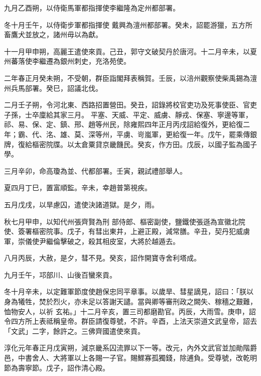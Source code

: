 \begin{pinyinscope}
 九月乙酉朔，以侍衛馬軍都指揮使李繼隆為定州都部署。



 冬十月壬午，以侍衛步軍都指揮使
 戴興為澶州都部署。癸未，詔罷游獵，五方所畜鷹犬並放之，諸州毋以為獻。



 十一月甲申朔，高麗王遣使來貢。己丑，郭守文破契丹於唐河。十二月辛未，以夏州蕃落使李繼遷為銀州刺史，充洛苑使。



 二年春正月癸未朔，不受朝，群臣詣閣拜表稱賀。壬辰，以涪州觀察使柴禹錫為澶州兵馬部署。癸巳，詔議北伐。



 二月壬子朔，令河北東、西路招置營田。癸丑，詔錄將校官吏功及死事使臣、官吏子孫，士卒廩給其家三月。
 平塞、天威、平定、威虜、靜戎、保塞、寧邊等軍，祁、易、保、定、鎮、邢、趙等州民，除雍熙四年正月丙戌詔給復外，更給復二年；霸、代、洺、雄、莫、深等州，平虜、岢嵐軍，更給復一年。戊午，罷乘傳銀牌，復給樞密院牒。以太倉粟貸京畿饑民。癸亥，作方田。戊辰，以國子監為國子學。



 三月辛卯，命高瓊為並、代都部署。壬寅，親試禮部舉人。



 夏四月丁巳，置富順監。辛未，幸趙普第視疾。



 五月戊戌，以旱慮囚，遣使決諸道獄。是夕，雨。



 秋七月甲申，以知代州張齊賢為刑
 部侍郎、樞密副使，鹽鐵使張遜為宣徽北院使、簽署樞密院事。戊子，有彗出東井，上避正殿，減常膳。辛丑，契丹犯威虜軍，崇儀使尹繼倫擊破之，殺其相皮室，大將於越遁去。



 八月丙辰，大赦，是夕，彗不見。癸亥，詔作開寶寺舍利塔成。



 九月壬午，邛部川、山後百蠻來貢。



 冬十月辛未，以定難軍節度使趙保忠同平章事。以歲旱、彗星謫見，詔曰：「朕以身為犧牲，焚於烈火，亦未足以答謝天譴。當與卿等審刑政之闕失、稼穡之艱難，恤物安人，以祈
 玄祐。」十二月辛亥，置三司都磨勘官。丙辰，大雨雪。庚申，詔令四方所上表祗稱皇帝。群臣請復尊號，不許。辛酉，上法天崇道文武皇帝，詔去「文武」二字，餘許之。三佛齊國遣使來貢。



 淳化元年春正月戊寅朔，減京畿系囚流罪以下一等。改元，內外文武官並加勛階爵邑，中書舍人、大將軍以上各賜一子官。賜鰥寡孤獨錢，除逋負。受尊號，改乾明節為壽寧節。戊子，詔作清心殿。




\end{pinyinscope}
